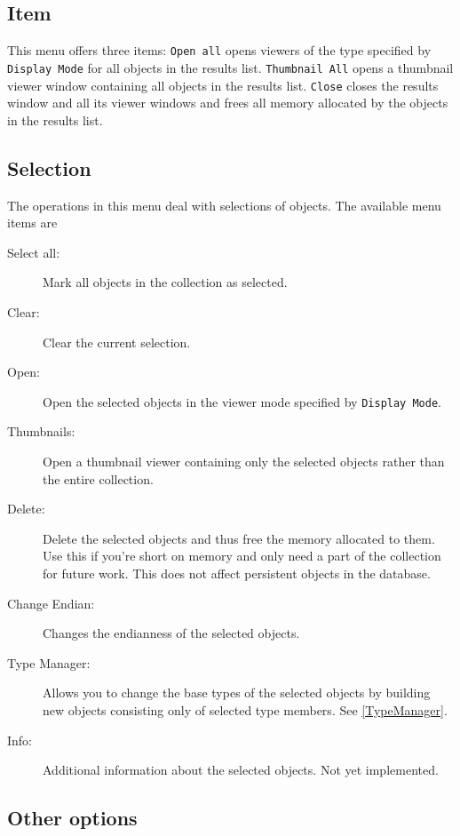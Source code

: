 \documentclass[11pt]{article}
\begin{document}
\subsection{Item}

This menu offers three items: \texttt{Open all} opens viewers of the type specified by
\texttt{Display Mode} for all objects in the results list. \texttt{Thumbnail All} opens
a thumbnail viewer window containing all objects in the results list. \texttt{Close}
closes the results window and all its viewer windows and frees all memory
allocated by the objects in the results list.

\subsection{Selection}

The operations in this menu deal with selections of objects. The available menu
items are

\begin{description}
\item[Select all:] Mark all objects in the collection as selected.
\item[Clear:] Clear the current selection.
\item[Open:] Open the selected objects in the viewer mode specified by \texttt{Display
Mode}.
\item[Thumbnails:] Open a thumbnail viewer containing only the selected objects
rather than the entire collection.
\item[Delete:] Delete the selected objects and thus free the memory allocated to
them. Use this if you're short on memory and only need a part of the collection
for future work. This does not affect persistent objects in the database.
\item[Change Endian:] Changes the endianness of the selected objects.
\item[Type Manager:] Allows you to change the base types of the selected objects
by building new objects consisting only of selected type members. See
\ref{TypeManager}.
\item[Info:] Additional information about the selected objects. Not yet implemented.
\end{description}


\subsection{Other options}
\end{document}
